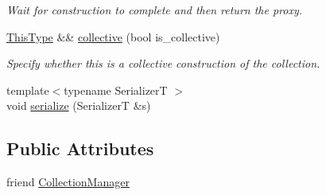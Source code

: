 \begin{DoxyCompactItemize}
$$\begin{DoxyCompactList}\small\item\em Wait for construction to complete and then return the proxy. \end{DoxyCompactList}\item 
\hyperlink{structvt_1_1vrt_1_1collection_1_1param_1_1_construct_params_a13d4910c0f6825c7b0ddfebce5288bea}{This\+Type} \&\& \hyperlink{structvt_1_1vrt_1_1collection_1_1param_1_1_construct_params_aded96b7d8b93f3ae8b91c419cbce6ddd}{collective} (bool is\+\_\+collective)
\begin{DoxyCompactList}\small\item\em Specify whether this is a collective construction of the collection. \end{DoxyCompactList}\item 
{\footnotesize template$<$typename SerializerT $>$ }\\void \hyperlink{structvt_1_1vrt_1_1collection_1_1param_1_1_construct_params_a315a60ef3b90e398f68a8abf02561b05}{serialize} (SerializerT \&s)
\end{DoxyCompactItemize}
\subsection*{Public Attributes}
\begin{DoxyCompactItemize}
\item 
friend \hyperlink{structvt_1_1vrt_1_1collection_1_1param_1_1_construct_params_a8a00b8a2017cec4453e2be8dd90742c7}{Collection\+Manager}
\end{DoxyCompactItemize}
